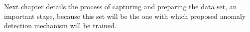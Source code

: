 
Next chapter details the process of capturing and preparing the data set, an important stage, because this set will be the one with which proposed anomaly detection mechanism will be trained.
